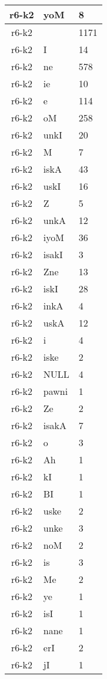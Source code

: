 \documentclass[a4 paper]{article}
\begin{document}
\begin{longtable}{cp{}p{}}
r6-k2 & yoM & 8\\ \midrule r6-k2 &  & 1171\\ \midrule r6-k2 & I & 14\\ \midrule r6-k2 & ne & 578\\ \midrule r6-k2 & ie & 10\\ \midrule r6-k2 & e & 114\\ \midrule r6-k2 & oM & 258\\ \midrule r6-k2 & unkI & 20\\ \midrule r6-k2 & M & 7\\ \midrule r6-k2 & iskA & 43\\ \midrule r6-k2 & uskI & 16\\ \midrule r6-k2 & Z & 5\\ \midrule r6-k2 & unkA & 12\\ \midrule r6-k2 & iyoM & 36\\ \midrule r6-k2 & isakI & 3\\ \midrule r6-k2 & Zne & 13\\ \midrule r6-k2 & iskI & 28\\ \midrule r6-k2 & inkA & 4\\ \midrule r6-k2 & uskA & 12\\ \midrule r6-k2 & i & 4\\ \midrule r6-k2 & iske & 2\\ \midrule r6-k2 & NULL & 4\\ \midrule r6-k2 & pawni & 1\\ \midrule r6-k2 & Ze & 2\\ \midrule r6-k2 & isakA & 7\\ \midrule r6-k2 & o & 3\\ \midrule r6-k2 & Ah & 1\\ \midrule r6-k2 & kI & 1\\ \midrule r6-k2 & BI & 1\\ \midrule r6-k2 & uske & 2\\ \midrule r6-k2 & unke & 3\\ \midrule r6-k2 & noM & 2\\ \midrule r6-k2 & is & 3\\ \midrule r6-k2 & Me & 2\\ \midrule r6-k2 & ye & 1\\ \midrule r6-k2 & isI & 1\\ \midrule r6-k2 & nane & 1\\ \midrule r6-k2 & erI & 2\\ \midrule r6-k2 & jI & 1\\ \midrule 

\end{longtable}
\end{document}
